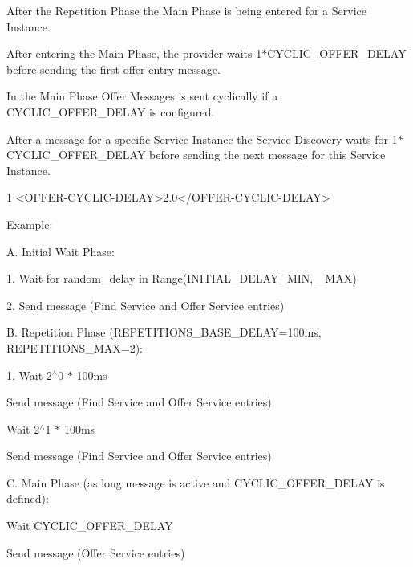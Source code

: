 \begin{DoxyItemize}
\item After the Repetition Phase the Main Phase is being entered for a Service Instance.
\item After entering the Main Phase, the provider waits 1$\ast$\+C\+Y\+C\+L\+I\+C\+\_\+\+O\+F\+F\+E\+R\+\_\+\+D\+E\+L\+AY before sending the first offer entry message.
\item In the Main Phase Offer Messages is sent cyclically if a C\+Y\+C\+L\+I\+C\+\_\+\+O\+F\+F\+E\+R\+\_\+\+D\+E\+L\+AY is configured.
\item After a message for a specific Service Instance the Service Discovery waits for 1$\ast$\+C\+Y\+C\+L\+I\+C\+\_\+\+O\+F\+F\+E\+R\+\_\+\+D\+E\+L\+AY before sending the next message for this Service Instance. 
\begin{DoxyCode}
1 <\textcolor{keywordtype}{OFFER-CYCLIC-DELAY}>2.0</\textcolor{keywordtype}{OFFER-CYCLIC-DELAY}>
\end{DoxyCode}

\item Example\+:
\item A. Initial Wait Phase\+:
\begin{DoxyItemize}
\item 1. Wait for random\+\_\+delay in Range(\+I\+N\+I\+T\+I\+A\+L\+\_\+\+D\+E\+L\+A\+Y\+\_\+\+M\+I\+N, \+\_\+\+M\+A\+X)
\item 2. Send message (Find Service and Offer Service entries)
\end{DoxyItemize}
\item B. Repetition Phase (R\+E\+P\+E\+T\+I\+T\+I\+O\+N\+S\+\_\+\+B\+A\+S\+E\+\_\+\+D\+E\+L\+AY=100ms, R\+E\+P\+E\+T\+I\+T\+I\+O\+N\+S\+\_\+\+M\+AX=2)\+:
\begin{DoxyItemize}
\item 1. Wait 2$^\wedge$0 $\ast$ 100ms
\item Send message (Find Service and Offer Service entries)
\item Wait 2$^\wedge$1 $\ast$ 100ms
\item Send message (Find Service and Offer Service entries)
\end{DoxyItemize}
\item C. Main Phase (as long message is active and C\+Y\+C\+L\+I\+C\+\_\+\+O\+F\+F\+E\+R\+\_\+\+D\+E\+L\+AY is defined)\+:
\begin{DoxyItemize}
\item Wait C\+Y\+C\+L\+I\+C\+\_\+\+O\+F\+F\+E\+R\+\_\+\+D\+E\+L\+AY
\item Send message (Offer Service entries)
\end{DoxyItemize}
\end{DoxyItemize}

